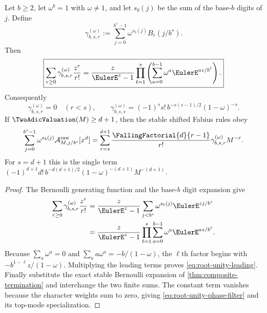 \begin{theorem}
\label{thm:root-unity-filter}
Let $b\ge2$, let $\omega^b=1$ with $\omega\ne1$, and let $s_b(j)$ be the
sum of the base-$b$ digits of $j$.  Define
\[
 \gamma_{b,s,r}^{(\omega)}
 :=\sum_{j=0}^{b^s-1}\omega^{s_b(j)}B_r(j/b^s).
\]
Then
\begin{equation}
 \boxed{\sum_{r\ge0}\gamma_{b,s,r}^{(\omega)}{z^r\over r!}
 ={z\over\EulerE^z-1}
  \prod_{\ell=1}^s\left(\sum_{a=0}^{b-1}
  \omega^a\EulerE^{az/b^\ell}\right).}
 \label{eq:root-unity-egf}
\end{equation}
Consequently
\begin{equation}
 \gamma_{b,s,r}^{(\omega)}=0\quad(r<s),
 \qquad
 \gamma_{b,s,s}^{(\omega)}
 =(-1)^ss!\,b^{-s(s-1)/2}(1-\omega)^{-s}.
 \label{eq:root-unity-leading}
\end{equation}
If $\TwoAdicValuation(M)\ge d+1$, then the stable shifted Fabius rules obey
\begin{equation}
 \sum_{j=0}^{b^s-1}\omega^{s_b(j)}
 \mathcal A^{\mathrm{raw}}_{M,j/b^s}[x^d]
 =\sum_{r=s}^{d+1}{\FallingFactorial{d}{r-1}\over r!}
 \gamma_{b,s,r}^{(\omega)}M^{-r}.
 \label{eq:root-unity-phase-filter}
\end{equation}
For $s=d+1$ this is the single term
$(-1)^{d+1}d!\,b^{-d(d+1)/2}(1-\omega)^{-(d+1)}M^{-(d+1)}$.
\end{theorem}

\begin{proof}
The Bernoulli generating function and the base-$b$ digit expansion give
\begin{align*}
 \sum_{r\ge0}\gamma_{b,s,r}^{(\omega)}{z^r\over r!}
 &={z\over\EulerE^z-1}
   \sum_{j<b^s}\omega^{s_b(j)}\EulerE^{zj/b^s}\\
 &={z\over\EulerE^z-1}
   \prod_{\ell=1}^s\sum_{a=0}^{b-1}
   \omega^a\EulerE^{az/b^\ell}.
\end{align*}
Because $\sum_a\omega^a=0$ and
$\sum_a a\omega^a=-b/(1-\omega)$, the $\ell$th factor begins with
$-b^{1-\ell}z/(1-\omega)$.  Multiplying the leading terms proves
\eqref{eq:root-unity-leading}.  Finally substitute the exact stable
Bernoulli expansion of \cref{thm:composite-termination} and interchange
the two finite sums.  The constant term vanishes because the character
weights sum to zero, giving \eqref{eq:root-unity-phase-filter} and its
top-mode specialization.
\end{proof}

